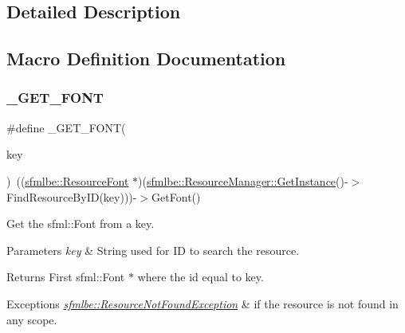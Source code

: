 \subsection{Detailed Description}


\subsection{Macro Definition Documentation}
\mbox{\label{group___t_e_s_t___g_r_o_u_p_ga171b5a386e18923861417af7b15ecdd7}} 
\subsubsection{\texorpdfstring{\+\_\+\+G\+E\+T\+\_\+\+F\+O\+NT}{\_GET\_FONT}}
{\footnotesize\ttfamily \#define \+\_\+\+G\+E\+T\+\_\+\+F\+O\+NT(\begin{DoxyParamCaption}\item[{}]{key }\end{DoxyParamCaption})~((\mbox{\hyperlink{classsfmlbe_1_1_resource_font}{sfmlbe\+::\+Resource\+Font}} $\ast$)(\mbox{\hyperlink{classsfmlbe_1_1_singleton_a313529b2a097425bf5500df8848ead3e}{sfmlbe\+::\+Resource\+Manager\+::\+Get\+Instance}}()-\/$>$Find\+Resource\+By\+ID(key)))-\/$>$Get\+Font()}

Get the sfml\+::\+Font from a key. 
\begin{DoxyParams}{Parameters}
{\em key} & String used for ID to search the resource. \\
\hline
\end{DoxyParams}
\begin{DoxyReturn}{Returns}
First sfml\+::\+Font $\ast$ where the id equal to key. 
\end{DoxyReturn}

\begin{DoxyExceptions}{Exceptions}
{\em \mbox{\hyperlink{classsfmlbe_1_1_resource_not_found_exception}{sfmlbe\+::\+Resource\+Not\+Found\+Exception}}} & if the resource is not found in any scope. \\
\hline
\end{DoxyExceptions}
\mbox{\label{group___t_e_s_t___g_r_o_u_p_gaded42a0ab80920668c19198ecdc5496b}} 
